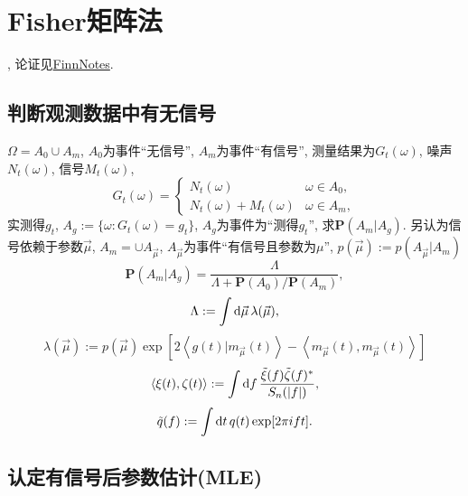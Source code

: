 \chapter{Fisher矩阵法}

\def\P{\mathbf{P} }
\cite{Finn1992}, 论证见\href{https://github.com/GasinAn/GWAstroNotes/blob/main/Finn/FinnNotes.pdf}{FinnNotes}.

\section{判断观测数据中有无信号}

$\Omega=A_0\cup A_m$, $A_0$为事件``无信号'', $A_m$为事件``有信号'', 测量结果为$G_t(\omega)$, 噪声$N_t(\omega)$, 信号$M_t(\omega)$,
\begin{equation}
    G_t(\omega)=\begin{cases}
        N_t(\omega)&\omega\in A_0,\\
        N_t(\omega)+M_t(\omega)&\omega\in A_m,
    \end{cases}
\end{equation}
实测得$g_t$, $A_g:=\{\omega:G_t(\omega)=g_t\}$, $A_g$为事件为``测得$g_t$'', 求$\P(A_m|A_g)$. 另认为信号依赖于参数$\vec{\mu}$, $A_m=\cup A_{\vec{\mu}}$, $A_{\vec{\mu}}$为事件``有信号且参数为$\mu$'', $p(\vec{\mu}):=p(A_{\vec{\mu}}|A_m)$
\begin{equation}
    \P(A_m|A_g)=\frac{\Lambda}{\Lambda+\P(A_0)/\P(A_m)},
\end{equation}
\begin{equation}
    \Lambda:=\int\mathrm{d}\vec{\mu}\,\lambda(\vec{\mu}),
\end{equation}
\begin{equation}
    \lambda(\vec{\mu}):=p(\vec{\mu})\exp[2\left\langle g(t)|m_{\vec{\mu}}(t)\right\rangle -\left\langle m_{\vec{\mu}}(t),m_{\vec{\mu}}(t)\right\rangle]
\end{equation}
\begin{equation}
    \left\langle \xi(t),\zeta(t)\right\rangle:=\int\mathrm{d} f\,\frac{\tilde{\xi}(f)\tilde{\zeta}(f)^*}{S_n(\left\lvert f\right\rvert )},
\end{equation}
\begin{equation}
    \tilde{q}(f):=\int\mathrm{d} t\,q(t)\exp[2\pi ift].
\end{equation}

\section{认定有信号后参数估计(MLE)}

